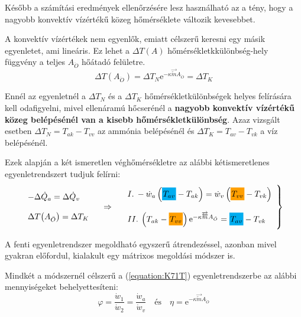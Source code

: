 Később a számítási eredmények ellenőrzésére lesz használható az a tény, hogy a nagyobb konvektív vízértékű közeg hőmérséklete változik kevesebbet.

A konvektív vízértékek nem egyenlők, emiatt célszerű keresni egy másik egyenletet, ami lineáris. Ez lehet a $\Delta T\!\left(A\right)$ hőmérsékletkkülönbség-hely függvény a teljes $A_{\ddot{O}}$ hőátadó felületre.
\begin{equation}
	\Delta T\!\left(A_{\ddot{O}}\right) = \Delta T_N \mathrm{e}^{-\kappa \overrightarrow{\overleftarrow{m}} A_{\ddot{O}}} = \Delta T_K
\end{equation}

Ennél az egyenletnél a $\Delta T_N$ és a $\Delta T_K$ hőmérsékletkülönbségek helyes felírására kell odafigyelni, mivel ellenáramú hőcserénél a \textbf{nagyobb konvektív vízértékű közeg belépésénél van a kisebb hőmérsékletkülönbség}. Azaz vizsgált esetben $\Delta T_N = T_{ak} - T_{vv}$ az ammónia belépésénél és $\Delta T_K = T_{av} - T_{vk}$ a víz belépésénél.

Ezek alapján a két ismeretlen véghőmérsékletre az alábbi kétismeretlenes egyenletrendszert tudjuk felírni:
\begin{equation}
	\label{equation:K71T}
	\begin{array}{l}
		-\Delta \dot{Q}_a = \Delta \dot{Q}_v
		\\ \\
		\Delta T\!\left(A_{\ddot{O}}\right) = \Delta T_K
	\end{array}
	\quad \Rightarrow \quad
	\left.
	\begin{array}{l}
		I.\: -\dot{w}_a \left(\highlight{cyan}{T_{av}} - T_{ak}\right) 
		= 
		\dot{w}_v \left(\highlight{orange!75!yellow}{T_{vv}} - T_{vk}\right) 
		\\ \\
		II.\: \left(T_{ak} - \highlight{orange!75!yellow}{T_{vv}}\right) \mathrm{e}^{-\kappa \overrightarrow{\overleftarrow{m}} A_{\ddot{O}}} = \highlight{cyan}{T_{av}} - T_{vk}
	\end{array}
	\right\rbrace
\end{equation}

A fenti egyenletrendszer megoldható egyszerű átrendezéssel, azonban mivel gyakran előfordul, kialakult egy mátrixos megoldási módszer is.

Mindkét a módszernél célszerű a (\ref{equation:K71T}) egyenletrendszerbe az alábbi mennyiségeket behelyettesíteni:
\begin{equation}
	\label{equation:K71FE}
	\varphi = \dfrac{\dot{w}_1}{\dot{w}_2} = \dfrac{\dot{w}_a}{\dot{w}_v}
	\quad \textrm{és} \quad 
	\eta = \mathrm{e}^{-\kappa \overrightarrow{\overleftarrow{m}} A_{\ddot{O}}}
\end{equation}

